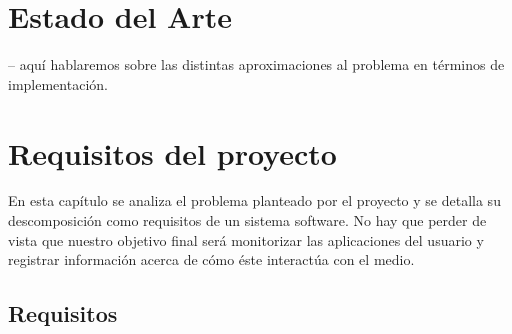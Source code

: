 \documentclass[12pt,a4paper,oneside]{book} %
\begin{document}
\chapter{Estado del Arte}
-- aquí hablaremos sobre las distintas aproximaciones al problema en términos de implementación. 

\chapter{Requisitos del proyecto}
En esta capítulo se analiza el problema planteado por el proyecto y se detalla su descomposición como requisitos de un sistema software. No hay que perder de vista que nuestro objetivo final será monitorizar las aplicaciones del usuario y registrar información acerca de cómo éste interactúa con el medio.
\newpage
\section{Requisitos}
\end{document}
